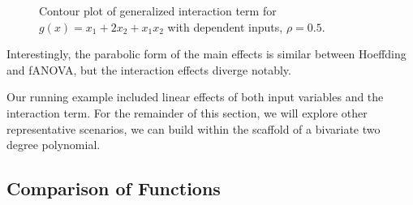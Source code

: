 \begin{figure}[htpb]
\begin{minipage}[t]{0.49\textwidth}
        \caption{Contour plot of generalized interaction term for $g(x) = x_1 + 2 x_2 + x_1 x_2$ with dependent inputs, $\rho = 0.5$.}
        \label{fig:dep_150_interact}
    \end{minipage}
\end{figure}
Interestingly, the parabolic form of the main effects is similar between Hoeffding and fANOVA, but the interaction effects diverge notably.\par
Our running example included linear effects of both input variables and the interaction term. For the remainder of this section, we will explore other representative scenarios, we can build within the scaffold of a bivariate two degree polynomial.

\subsection{Comparison of Functions}
